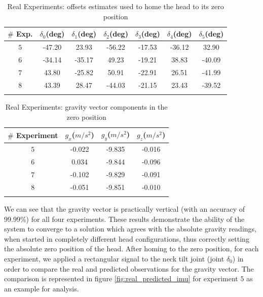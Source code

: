 \begin{table}
\centering
\begin{tabular}{ccccccc}
 \hline
 $\#$ Exp. & $\delta_0$(deg) & $\delta_1$(deg) & $\delta_2$(deg) & $\delta_3$(deg) & $\delta_4$(deg) & $\delta_5$(deg) \\
 \hline
$5$ & -47.20 & 23.93 & -56.22 & -17.53 & -36.12 & 32.90 \\
$6$ & -34.14 & -35.17 & 49.23 & -19.21 & 38.83 & -40.09 \\
$7$ & 43.80 & -25.82 & 50.91 & -22.91 & 26.51 & -41.99 \\
$8$ & 43.39 & 28.47 & -44.03 & -21.15 & 23.43 & -39.52 \\
 \hline\\
\end{tabular}
\caption{Real Experiments: offsets estimates used to home the head to its zero position}
\label{tab:zero_position_offsets}
\end{table}

\begin{table}
\centering
\begin{tabular}{cccc}
 \hline
 $\#$ Experiment & $g_x$($m/s^2$) & $g_y$($m/s^2$) & $g_z$($m/s^2$) \\
 \hline
$5$ & -0.022 & -9.835 & -0.016 \\
$6$ & 0.034 & -9.844 & -0.096\\
$7$ & -0.102 & -9.829 & -0.091 \\
$8$ & -0.051 & -9.851 & -0.010 \\
 \hline\\
\end{tabular}
\caption{Real Experiments: gravity vector components in the zero position}
\label{tab:zero_position}
\end{table}

We can see that the gravity vector is practically vertical (with an accuracy of 99.99\%) for all four experiments. These results demonstrate the ability of the system to converge to a solution which agrees with the absolute gravity readings, when started in completely different head configurations, thus correctly setting the absolute zero position of the head. After homing to the zero position, for each experiment, we applied a rectangular signal to the neck tilt joint (joint $\delta_0$) in order to compare the real and predicted observations for the gravity vector. The comparison is represented in figure \ref{fig:real_predicted_imu} for experiment $5$ as an example for analysis.

